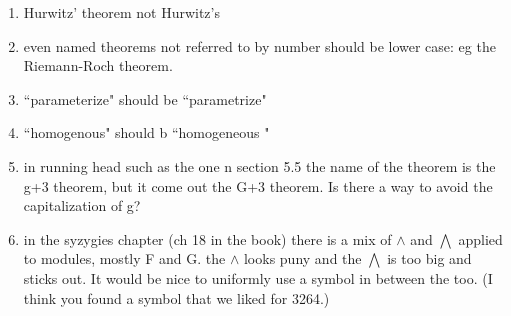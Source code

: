 \documentclass[12pt, leqno]{book}
\begin{document}
\begin{enumerate}
 \item Hurwitz' theorem not Hurwitz's 
 
 \item even named theorems not referred to by number should be lower case: eg the Riemann-Roch theorem. 
 
 \item  ``parameterize" should be  ``parametrize"
 
\item ``homogenous" should b ``homogeneous " 

\item in running head such as the one n section 5.5 the name of the theorem is the g+3 theorem, but it come out the G+3 theorem.
Is there a way to avoid the capitalization of g?

\item in the syzygies chapter (ch 18 in the book) there is a mix of $\wedge$ and $\bigwedge$ applied to modules, mostly F and G.
the $\wedge$ looks puny and the $\bigwedge$ is too big and sticks out. It would be nice to uniformly use a symbol in between the too.
(I think you found a symbol that we liked for 3264.)
 
 \end{enumerate}
\end{document}
